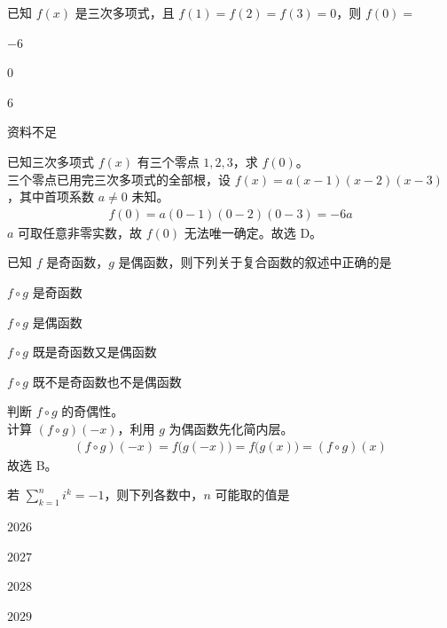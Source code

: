 \begin{question}
    已知 $f(x)$ 是三次多项式，且 $f(1)=f(2)=f(3)=0$，则 $f(0)=$ \paren[D]
    \begin{choices}
        \item $-6$
        \item $0$
        \item $6$
        \item 资料不足
    \end{choices}
\end{question}

\begin{solution}
    已知三次多项式 $f(x)$ 有三个零点 $1,2,3$，求 $f(0)$。\\
    三个零点已用完三次多项式的全部根，设 $f(x)=a(x-1)(x-2)(x-3)$，其中首项系数 $a\neq0$ 未知。\\
    \begin{align*}
        f(0)=a(0-1)(0-2)(0-3)=-6a
    \end{align*}
    $a$ 可取任意非零实数，故 $f(0)$ 无法唯一确定。故选 D。
\end{solution}

\begin{question}
    已知 $f$ 是奇函数，$g$ 是偶函数，则下列关于复合函数的叙述中正确的是 \paren[B]
    \begin{choices}
        \item $f\circ g$ 是奇函数
        \item $f\circ g$ 是偶函数
        \item $f\circ g$ 既是奇函数又是偶函数
        \item $f\circ g$ 既不是奇函数也不是偶函数
    \end{choices}
\end{question}

\begin{solution}
    判断 $f\circ g$ 的奇偶性。\\
    计算 $(f\circ g)(-x)$，利用 $g$ 为偶函数先化简内层。\\
    \begin{align*}
        (f\circ g)(-x)=f\bigl(g(-x)\bigr)=f\bigl(g(x)\bigr)=(f\circ g)(x)
    \end{align*}
    故选 B。
\end{solution}

\begin{question}
    若 $\displaystyle\sum_{k=1}^{n} i^{k}=-1$，则下列各数中，$n$ 可能取的值是 \paren[B]
    \begin{choices}
        \item $2026$
        \item $2027$
        \item $2028$
        \item $2029$
    \end{choices}
\end{question}

